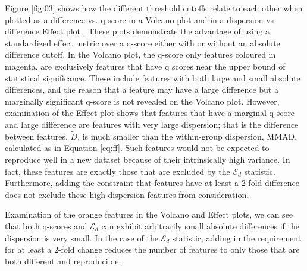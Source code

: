Figure \ref{fig:03} shows how the different threshold cutoffs relate to each other when plotted as a difference vs. q-score in a Volcano plot \citep{Cui:2003aa} and in a dispersion vs difference Effect plot \citep{gloor:effect}. These plots demonstrate the advantage of using a standardized effect metric over a q-score either with or without an absolute difference cutoff. In the Volcano plot, the q-score only features coloured in magenta, are exclusively features that have q scores near the upper bound of statistical significance. These include features with both large and small absolute differences, and the reason that a feature may have a large difference but a marginally significant q-score is not revealed on the Volcano plot. However, examination of the Effect plot shows that features that have a marginal q-score and large difference are features with very large dispersion; that is the difference between features, $\tilde{D}$, is much smaller than the within-group dispersion, MMAD, calculated as in Equation \ref{eq:ff}. Such features would not be expected to reproduce well in a new dataset because of their intrinsically high variance. In fact, these features are exactly those that are excluded by the $\mathcal{E}_{d} $ statistic.  Furthermore, adding the constraint that features have at least a 2-fold difference does not exclude these high-dispersion features from consideration. 

Examination of the orange features in the Volcano and Effect plots, we can see that both q-scores and $\mathcal{E}_{d} $ can exhibit arbitrarily small absolute differences if the dispersion is very small. In the case of the $\mathcal{E}_{d} $ statistic, adding in the requirement for at least a 2-fold change reduces the number of features to only those that are both different and reproducible.  
